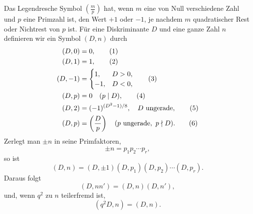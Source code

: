 \documentclass[11pt]{article}
\newcommand{\Jac}[2]{\left(\frac{#1}{#2}\right)}
\begin{document}
Das Legendresche Symbol \(\Jac{m}{p}\) hat, wenn \(m\) eine von Null verschiedene Zahl und \(p\) eine Primzahl ist, den Wert \(+1\) oder \(-1\), je nachdem \(m\) quadratischer Rest oder Nichtrest von \(p\) ist.  Für eine Diskriminante \(D\) und eine ganze Zahl \(n\) definieren wir ein Symbol \((D,n)\) durch
\begin{align}
        (D,0)&=0,\tag{1}\\
        (D,1)&=1,\tag{2}\\
        (D,-1)&=\begin{cases}1,&D>0,\\ -1,&D<0,\end{cases}\tag{3}\\
        (D,p)&=0\quad(p\mid D),\tag{4}\\
        (D,2)&=(-1)^{(D^2-1)/8},\quad D\hbox{ ungerade},\tag{5}\\
        (D,p)&=\Jac{D}{p}\quad(p\hbox{ ungerade},\ p\nmid D).\tag{6}
\end{align}
Zerlegt man \(\pm n\) in seine Primfaktoren,
\[
        \pm n=p_1p_2\cdots p_r,
\]
so ist
\begin{equation}
        (D,n)=(D,\pm1)(D,p_1)(D,p_2)\cdots(D,p_r).
\tag{7}
\end{equation}
Daraus folgt
\begin{equation}
        (D,nn')=(D,n)(D,n'),
\tag{8}
\end{equation}
und, wenn \(q^2\) zu \(n\) teilerfremd ist,
\begin{equation}
        (q^2D,n)=(D,n).
\tag{9}
\end{equation}
\end{document}
